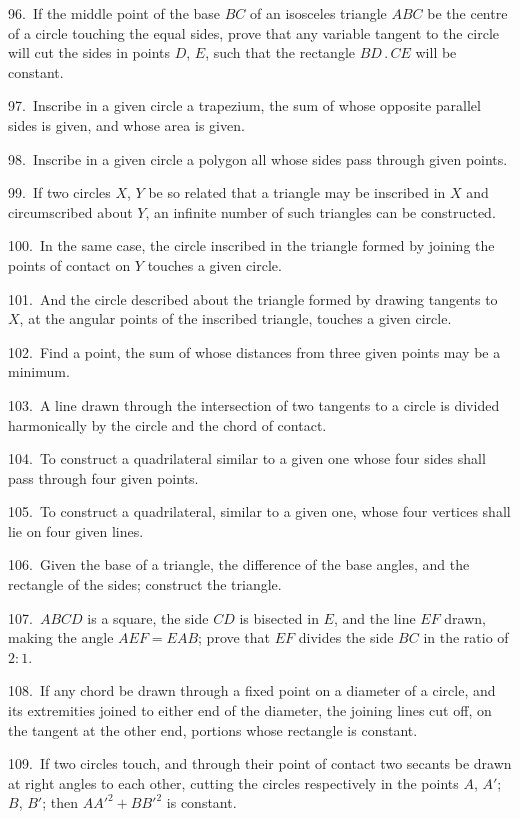 \documentclass[oneside]{book}
\begin{document}
\begin{footnotesize}
96.~If the middle point of the base $BC$ of an isosceles triangle
$ABC$ be the centre of a circle touching the equal sides, prove that
any variable tangent to the circle will cut the sides in points
$D$, $E$, such that the rectangle $BD\,.\,CE$ will be constant.

97.~Inscribe in a given circle a trapezium, the sum of whose
opposite parallel sides is given, and whose area is given.

98.~Inscribe in a given circle a polygon all whose sides pass
through given points.

99.~If two circles $X$, $Y$ be so related that a triangle may be
inscribed in $X$ and circumscribed about $Y$, an infinite number of
such triangles can be constructed.

100.~In the same case, the circle inscribed in the triangle
formed by joining the points of contact on $Y$ touches a given
circle.

101.~And the circle described about the triangle formed by
drawing tangents to $X$, at the angular points of the inscribed triangle,
touches a given circle.

102.~Find a point, the sum of whose distances from three
given points may be a minimum.

103.~A line drawn through the intersection of two tangents to
a circle is divided harmonically by the circle and the chord of
contact.

104.~To construct a quadrilateral similar to a given one whose
four sides shall pass through four given points.

105.~To construct a quadrilateral, similar to a given one,
whose four vertices shall lie on four given lines.

106.~Given the base of a triangle, the difference of the base
angles, and the rectangle of the sides; construct the triangle.

107.~$ABCD$ is a square, the side $CD$ is bisected in $E$, and the
line $EF$ drawn, making the angle $AEF = EAB$; prove that $EF$
divides the side $BC$ in the ratio of $2 : 1$.

108.~If any chord be drawn through a fixed point on a diameter
of a circle, and its extremities joined to either end of the
diameter, the joining lines cut off, on the tangent at the other
end, portions whose rectangle is constant.

109.~If two circles touch, and through their point of contact
two secants be drawn at right angles to each other, cutting the
circles respectively in the points $A$, $A'$; $B$, $B'$; then $AA'^2 + BB'^2$
is constant.


\end{footnotesize}
\end{document}
